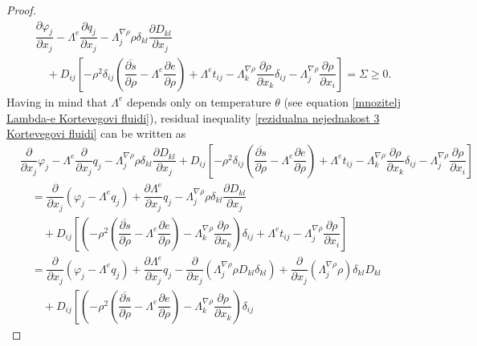 \documentclass[a4paper,fleqn]{cas-sc}
\theoremstyle{definition}
\begin{document}
\begin{proof}
\begin{align}
		& \dfrac{\partial\varphi_j}{\partial x_j} - \Lambda^e \dfrac{\partial q_j}{\partial x_j} - \Lambda^{\nabla\rho}_j\rho\delta_{kl}\dfrac{\partial D_{kl}}{\partial x_j}
		\\
		& \quad +D_{ij}\left[-\rho^2\delta_{ij}\left(\overline{\dfrac{\partial s}{\partial\rho}}-\Lambda^e\dfrac{\partial e}{\partial\rho}\right)+\Lambda^et_{ij}-\Lambda^{\nabla\rho}_k\dfrac{\partial\rho}{\partial x_k}\delta_{ij}-\Lambda^{\nabla\rho}_j\dfrac{\partial\rho}{\partial x_i}\right]=\Sigma\geq 0. 
		\nonumber 
	\end{align}
	Having in mind that $\Lambda^e$ depends only on temperature $\theta$ (see equation \eqref{mnozitelj Lambda-e Kortevegovi fluidi}), residual inequality \eqref{rezidualna nejednakost 3 Kortevegovi fluidi} can be written as
	\begin{align*}
		& \dfrac{\partial}{\partial x_j}\varphi_j - \Lambda^e\dfrac{\partial}{\partial x_j}q_j 
			- \Lambda^{\nabla\rho}_j\rho\delta_{kl} \dfrac{\partial D_{kl}}{\partial x_j} 
			+ D_{ij} \left[ -\rho^2\delta_{ij}\left(\overline{\dfrac{\partial s}{\partial\rho}} 
			- \Lambda^e\dfrac{\partial e}{\partial\rho} \right) + \Lambda^et_{ij} 
			- \Lambda^{\nabla\rho}_k\dfrac{\partial\rho}{\partial x_k}\delta_{ij} 
			- \Lambda^{\nabla\rho}_j\dfrac{\partial\rho}{\partial x_i} \right] 
		\\
		& \quad = \dfrac{\partial}{\partial x_j} \left( \varphi_j - \Lambda^eq_j\right) 
			+ \dfrac{\partial\Lambda^e}{\partial x_j}q_j 
			- \Lambda^{\nabla\rho}_j\rho\delta_{kl} \dfrac{\partial D_{kl}}{\partial x_j} 
		\\ 
		& \qquad + D_{ij} \left[ \left( -\rho^2\left(\overline{\dfrac{\partial s}{\partial\rho}} 
			- \Lambda^e \dfrac{\partial e}{\partial\rho} \right) 
			- \Lambda^{\nabla\rho}_k\dfrac{\partial\rho}{\partial x_k} \right) \delta_{ij} 
			+ \Lambda^e t_{ij} - \Lambda^{\nabla\rho}_j\dfrac{\partial\rho}{\partial x_i} \right] \\
			& \quad = \dfrac{\partial}{\partial x_j} \left( \varphi_j - \Lambda^eq_j \right) 
			+ \dfrac{\partial\Lambda^e}{\partial x_j}q_j 
			- \dfrac{\partial}{\partial x_j} \left( \Lambda^{\nabla\rho}_j\rho D_{kl} \delta_{kl} \right) 
			+ \dfrac{\partial}{\partial x_j}\left(\Lambda^{\nabla\rho}_j\rho\right) \delta_{kl} D_{kl} \\
			& \qquad + D_{ij} \left[ \left( -\rho^2\left(\overline{\dfrac{\partial s}{\partial\rho}} 
			- \Lambda^e\dfrac{\partial e}{\partial\rho} \right) 
			- \Lambda^{\nabla\rho}_k\dfrac{\partial\rho}{\partial x_k} \right) \delta_{ij} 

\end{align*}
\end{proof}
\end{document}
